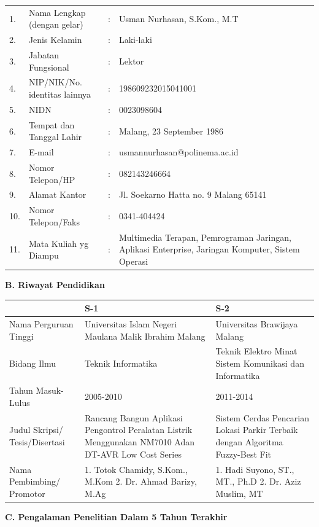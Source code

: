 {\footnotesize
\begin{longtable}{@{}p{0.8cm}p{6cm}p{0.3cm}p{8cm}}
1. & Nama Lengkap (dengan gelar) & : & Usman Nurhasan, S.Kom., M.T \\
2. & Jenis Kelamin & : & Laki-laki \\
3. & Jabatan Fungsional & : & Lektor \\
4. & NIP/NIK/No. identitas lainnya & : & 198609232015041001 \\
5. & NIDN & : & 0023098604 \\
6. & Tempat dan Tanggal Lahir & : & Malang, 23 September 1986 \\
7. & E-mail & : & usmannurhasan@polinema.ac.id \\
8. & Nomor Telepon/HP & : & 082143246664 \\
9. & Alamat Kantor & : & Jl. Soekarno Hatta no. 9 Malang 65141 \\
10. & Nomor Telepon/Faks & : & 0341-404424 \\
11. & Mata Kuliah yg Diampu & : & Multimedia Terapan, Pemrograman Jaringan, Aplikasi Enterprise, Jaringan Komputer, Sistem Operasi \\
\end{longtable}
}

\textbf{B. Riwayat Pendidikan}

{\footnotesize
\begin{longtable}{|p{3.5cm}|p{5.5cm}|p{6cm}|}
\hline
& \textbf{S-1} & \textbf{S-2} \\
\hline
Nama Perguruan Tinggi & Universitas Islam Negeri Maulana Malik Ibrahim Malang & Universitas Brawijaya Malang \\
\hline
Bidang Ilmu & Teknik Informatika & Teknik Elektro Minat Sistem Komunikasi dan Informatika \\
\hline
Tahun Masuk- Lulus & 2005-2010 & 2011-2014 \\
\hline
Judul Skripsi/ Tesis/Disertasi & Rancang Bangun Aplikasi Pengontrol Peralatan Listrik Menggunakan NM7010 Adan DT-AVR Low Cost Series & Sistem Cerdas Pencarian Lokasi Parkir Terbaik dengan Algoritma Fuzzy-Best Fit \\
\hline
Nama Pembimbing/ Promotor & 1. Totok Chamidy, S.Kom., M.Kom 2. Dr. Ahmad Barizy, M.Ag & 1. Hadi Suyono, ST., MT., Ph.D 2. Dr. Aziz Muslim, MT \\
\hline
\end{longtable}
}

\textbf{C. Pengalaman Penelitian Dalam 5 Tahun Terakhir}

